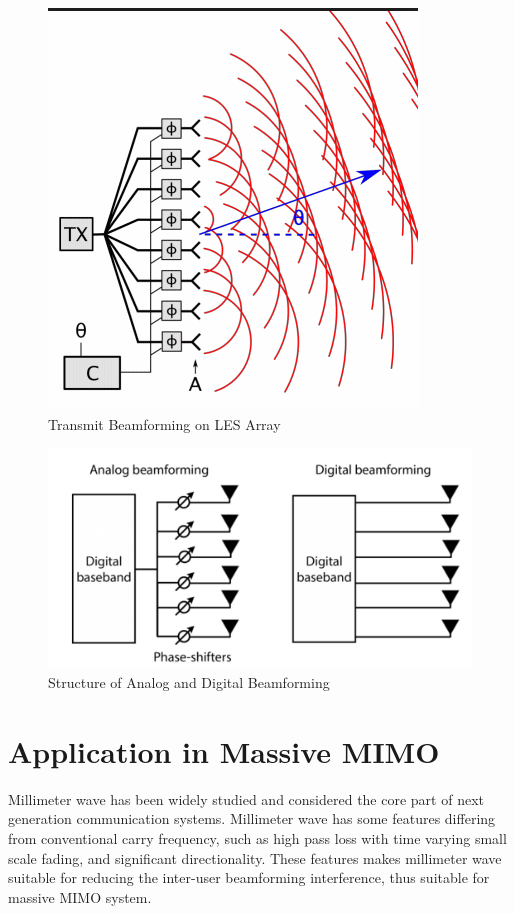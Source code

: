 \documentclass{article}
\begin{document}
\begin{figure}[h!]
\centering
\includegraphics[scale=0.4]{beamforming.png}
\caption{Transmit Beamforming on LES Array}
\label{fig:beamformingLES}
\end{figure}

\begin{figure}[h!]
\centering
\includegraphics[scale=0.3]{twobeamforming.png}
\caption{Structure of Analog and Digital Beamforming}
\label{fig:Twobeamforming}
\end{figure}

\section{Application in Massive MIMO}
Millimeter wave has been widely studied and considered the core part of next generation communication systems. Millimeter wave has some features differing from conventional carry frequency, such as high pass loss with time varying small scale fading, and significant directionality\cite{mmWave}.
These features makes millimeter wave suitable for reducing the inter-user beamforming interference, thus suitable for massive MIMO system.
\end{document}
